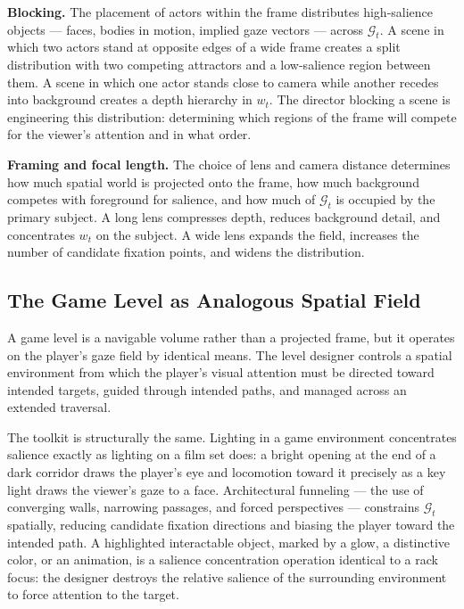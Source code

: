 \documentclass[12pt, a4paper]{article}
\theoremstyle{plain}
\theoremstyle{definition}
\theoremstyle{remark}
\newcommand{\G}{\mathcal{G}}
\newcommand{\salience}{w}
\begin{document}
\medskip
\noindent\textbf{Blocking.} The placement of actors within
the frame distributes high-salience objects --- faces,
bodies in motion, implied gaze vectors --- across $\G_t$.
A scene in which two actors stand at opposite edges of a
wide frame creates a split distribution with two competing
attractors and a low-salience region between them. A scene
in which one actor stands close to camera while another
recedes into background creates a depth hierarchy in
$\salience_t$. The director blocking a scene is engineering
this distribution: determining which regions of the frame
will compete for the viewer's attention and in what order.

\medskip
\noindent\textbf{Framing and focal length.} The choice of
lens and camera distance determines how much spatial world
is projected onto the frame, how much background competes
with foreground for salience, and how much of $\G_t$ is
occupied by the primary subject. A long lens compresses
depth, reduces background detail, and concentrates
$\salience_t$ on the subject. A wide lens expands the
field, increases the number of candidate fixation points,
and widens the distribution.

\subsection{The Game Level as Analogous Spatial Field}
\label{subsec:gamelevel}

A game level is a navigable volume rather than a projected
frame, but it operates on the player's gaze field by
identical means. The level designer controls a spatial
environment from which the player's visual attention must be
directed toward intended targets, guided through intended
paths, and managed across an extended traversal.

The toolkit is structurally the same. Lighting in a game
environment concentrates salience exactly as lighting on a
film set does: a bright opening at the end of a dark
corridor draws the player's eye and locomotion toward it
precisely as a key light draws the viewer's gaze to a face.
Architectural funneling --- the use of converging walls,
narrowing passages, and forced perspectives --- constrains
$\G_t$ spatially, reducing candidate fixation directions and
biasing the player toward the intended path. A highlighted
interactable object, marked by a glow, a distinctive color,
or an animation, is a salience concentration operation
identical to a rack focus: the designer destroys the
relative salience of the surrounding environment to force
attention to the target.
\end{document}

